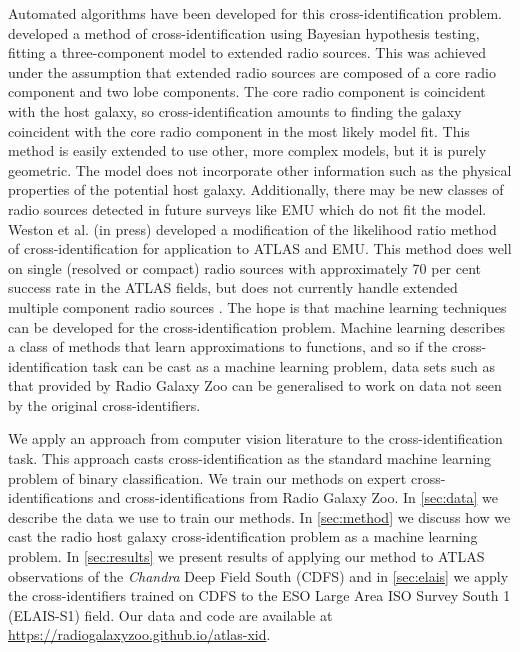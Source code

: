 \documentclass[fleqn,usenatbib,usedcolumn]{mnras}
\begin{document}
  Automated algorithms have been developed for this cross-identification
  problem. \citet{fan15} developed a method of cross-identification using
  Bayesian hypothesis testing, fitting a three-component model to extended
  radio sources. This was achieved under the assumption that extended radio
  sources are composed of a core radio component and two lobe components. The
  core radio component is coincident with the host galaxy, so
  cross-identification amounts to finding the galaxy coincident with the core
  radio component in the most likely model fit. This method is easily extended
  to use other, more complex models, but it is purely geometric. The model
  does not incorporate other information such as the physical properties of
  the potential host galaxy. Additionally, there may be new classes of radio
  sources detected in future surveys like EMU which do not fit the model.
  Weston et al. (in press) developed a modification of the likelihood ratio method of
  cross-identification \citep{richter75likelihood} for application to ATLAS
  and EMU. This method does well on single (resolved or compact) radio sources
  with approximately 70 per cent success rate in the ATLAS fields, but does
  not currently handle extended multiple component radio sources
  \citep{norris17unexpected}. The hope is that machine learning techniques can
  be developed for the cross-identification problem. Machine learning
  describes a class of methods that learn approximations to functions, and so
  if the cross-identification task can be cast as a machine learning problem,
  data sets such as that provided by Radio Galaxy Zoo can be generalised to
  work on data not seen by the original cross-identifiers.

  We apply an approach from computer vision literature to the
  cross-identification task. This approach casts cross-identification as the
  standard machine learning problem of binary classification. We train our
  methods on expert cross-identifications and cross-identifications from Radio
  Galaxy Zoo. In \autoref{sec:data} we describe the data we use to train our
  methods. In \autoref{sec:method} we discuss how we cast the radio host
  galaxy cross-identification problem as a machine learning problem. In
  \autoref{sec:results} we present results of applying our method to ATLAS
  observations of the \emph{Chandra} Deep Field South (CDFS) and in
  \autoref{sec:elais} we apply the cross-identifiers trained on CDFS to the
  ESO Large Area ISO Survey South 1 (ELAIS-S1) field. Our data and code are
  available at \url{https://radiogalaxyzoo.github.io/atlas-xid}.
\end{document}

